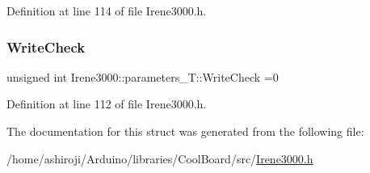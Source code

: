 Definition at line 114 of file Irene3000.\+h.

\mbox{\label{struct_irene3000_1_1parameters___t_a56f1f14d33a69300d580eda2dc52cecd}} 
\subsubsection{\texorpdfstring{Write\+Check}{WriteCheck}}
{\footnotesize\ttfamily unsigned int Irene3000\+::parameters\+\_\+\+T\+::\+Write\+Check =0}



Definition at line 112 of file Irene3000.\+h.



The documentation for this struct was generated from the following file\+:\begin{DoxyCompactItemize}
\item 
/home/ashiroji/\+Arduino/libraries/\+Cool\+Board/src/\hyperlink{_irene3000_8h}{Irene3000.\+h}\end{DoxyCompactItemize}

